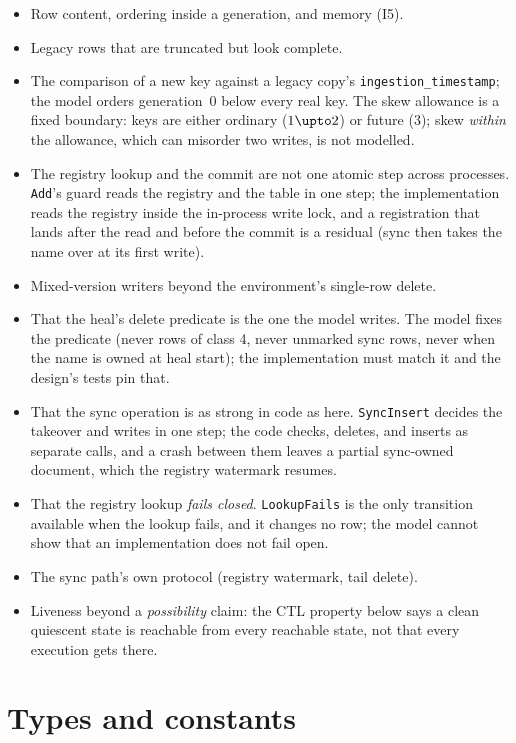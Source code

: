 \documentclass[a4paper,10pt,fleqn]{article}
\newcommand{\field}[1]{\texttt{#1}}
\begin{document}
\begin{itemize}
  \item Row content, ordering inside a generation, and memory (I5).
  \item Legacy rows that are truncated but look complete.
  \item The comparison of a new key against a legacy copy's
    \field{ingestion\_timestamp}; the model orders generation~0 below every
    real key. The skew allowance is a fixed boundary: keys are either ordinary
    ($1\upto2$) or future ($3$); skew \emph{within} the allowance, which can
    misorder two writes, is not modelled.
  \item The registry lookup and the commit are not one atomic step across
    processes. \field{Add}'s guard reads the registry and the table in one
    step; the implementation reads the registry inside the in-process write
    lock, and a registration that lands after the read and before the commit
    is a residual (sync then takes the name over at its first write).
  \item Mixed-version writers beyond the environment's single-row delete.
  \item That the heal's delete predicate is the one the model writes. The model
    fixes the predicate (never rows of class 4, never unmarked sync rows, never
    when the name is owned at heal start); the implementation must match it and
    the design's tests pin that.
  \item That the sync operation is as strong in code as here. \field{SyncInsert}
    decides the takeover and writes in one step; the code checks, deletes, and
    inserts as separate calls, and a crash between them leaves a partial
    sync-owned document, which the registry watermark resumes.
  \item That the registry lookup \emph{fails closed}. \field{LookupFails} is the
    only transition available when the lookup fails, and it changes no row; the
    model cannot show that an implementation does not fail open.
  \item The sync path's own protocol (registry watermark, tail delete).
  \item Liveness beyond a \emph{possibility} claim: the CTL property below says a
    clean quiescent state is reachable from every reachable state, not that
    every execution gets there.
\end{itemize}

\section{Types and constants}
\label{sec:types}
\end{document}
